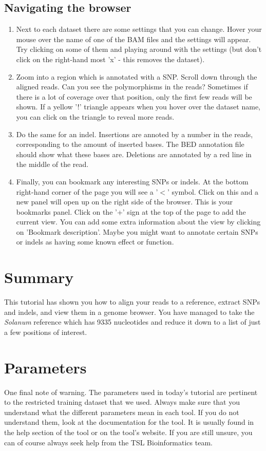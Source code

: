 \documentclass[12pt,a4paper]{article}
\begin{document}
\subsection{Navigating the browser}
\begin{enumerate}
	\item Next to each dataset there are some settings that you
          can change. Hover your mouse over the name of one of the BAM
          files and the settings will appear. Try clicking on some of
          them and playing around with the settings (but don't click
          on the right-hand most 'x' - this removes the dataset).
	\item Zoom into a region which is annotated with a SNP. Scroll
          down through the aligned reads. Can you see the
          polymorphisms in the reads? Sometimes if there is a lot of
          coverage over that position, only the first few reads will
          be shown. If a yellow '!' triangle appears when you hover
          over the dataset name, you can click on the triangle to
          reveal more reads.
	\item Do the same for an indel. Insertions are annoted by a
          number in the reads, corresponding to the amount of inserted
          bases. The BED annotation file should show what these bases
          are. Deletions are annotated by a red line in the middle of
          the read.
	\item Finally, you can bookmark any interesting SNPs or
          indels. At the bottom right-hand corner of the page you will
          see a '$<$' symbol. Click on this and a new panel will open
          up on the right side of the browser. This is your bookmarks
          panel. Click on the '+' sign at the top of the page to add
          the current view. You can add some extra information about
          the view by clicking on 'Bookmark description'. Maybe you
          might want to annotate certain SNPs or indels as having some
          known effect or function.
\end{enumerate}

\section{Summary}

This tutorial has shown you how to align your reads to a reference,
extract SNPs and indels, and view them in a genome browser. You have
managed to take the \emph{Solanum} reference which has 9335
nucleotides and reduce it down to a list of just a few positions of
interest.

\section{Parameters}

One final note of warning. The parameters used in today's tutorial are
pertinent to the restricted training dataset that we used. Always make
sure that you understand what the different parameters mean in each
tool. If you do not understand them, look at the documentation for the
tool. It is usually found in the help section of the tool or on the
tool's website. If you are still unsure, you can of course always seek
help from the TSL Bioinformatics team.
	
\end{document}
